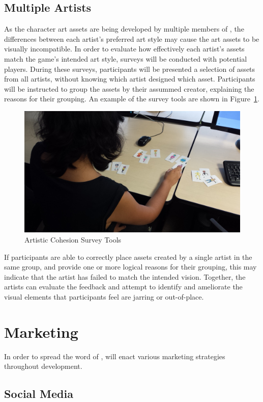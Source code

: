 \documentclass{GlobalDocument}
\begin{document}
\section{Multiple Artists}
As the character art assets are being developed by multiple members of \ourteam{}, the differences between each artist's preferred art style may cause the art assets to be visually incompatible. In order to evaluate how effectively each artist's assets match the game's intended art style, surveys will be conducted with potential players. During these surveys, participants will be presented a selection of assets from all artists, without knowing which artist designed which asset. Participants will be instructed to group the assets by their assummed creator, explaining the reasons for their grouping. An example of the survey tools are shown in Figure~\ref{fig:survey}.

\begin{figure}[htb]
\centering\includegraphics[width=.7\linewidth]{images/ArtisticCohesion}
\caption{Artistic Cohesion Survey Tools}
\label{fig:survey}
\end{figure}

If participants are able to correctly place assets created by a single artist in the same group, and provide one or more logical reasons for their grouping, this may indicate that the artist has failed to match the intended vision. Together, the artists can evaluate the feedback and attempt to identify and ameliorate the visual elements that participants feel are jarring or out-of-place.

\chapter{Marketing}

In order to spread the word of \ourgame{}, \ourteam{} will enact various marketing strategies throughout development.

\section{Social Media}
\end{document}
